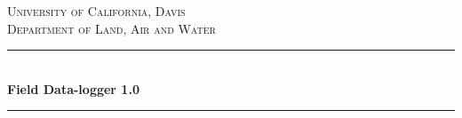 \begin{titlepage}

\newcommand{\HRule}{\rule{\linewidth}{0.5mm}} %

\center %


\textsc{\LARGE University of California, Davis}\\[1cm] %
\textsc{\Large Department of Land, Air and Water}\\[0.5cm] %


\HRule \\[0.4cm]
{ \huge \bfseries Field Data-logger 1.0}\\[0.4cm] %
\HRule \\[1cm]




\end{titlepage}
